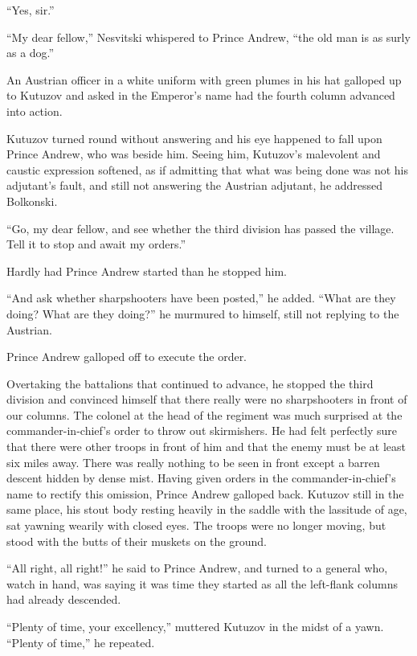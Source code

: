 ``Yes, sir.''

``My dear fellow,'' Nesvitski whispered to Prince Andrew, ``the
old man is as surly as a dog.''

An Austrian officer in a white uniform with green plumes in his
hat galloped up to Kutuzov and asked in the Emperor's name had
the fourth column advanced into action.

Kutuzov turned round without answering and his eye happened to
fall upon Prince Andrew, who was beside him. Seeing him,
Kutuzov's malevolent and caustic expression softened, as if
admitting that what was being done was not his adjutant's fault,
and still not answering the Austrian adjutant, he addressed
Bolkonski.

``Go, my dear fellow, and see whether the third division has
passed the village. Tell it to stop and await my orders.''

Hardly had Prince Andrew started than he stopped him.

``And ask whether sharpshooters have been posted,'' he
added. ``What are they doing? What are they doing?'' he murmured
to himself, still not replying to the Austrian.

Prince Andrew galloped off to execute the order.

Overtaking the battalions that continued to advance, he stopped
the third division and convinced himself that there really were
no sharpshooters in front of our columns. The colonel at the head
of the regiment was much surprised at the commander-in-chief's
order to throw out skirmishers. He had felt perfectly sure that
there were other troops in front of him and that the enemy must
be at least six miles away.  There was really nothing to be seen
in front except a barren descent hidden by dense mist. Having
given orders in the commander-in-chief's name to rectify this
omission, Prince Andrew galloped back. Kutuzov still in the same
place, his stout body resting heavily in the saddle with the
lassitude of age, sat yawning wearily with closed eyes. The
troops were no longer moving, but stood with the butts of their
muskets on the ground.

``All right, all right!'' he said to Prince Andrew, and turned to
a general who, watch in hand, was saying it was time they started
as all the left-flank columns had already descended.

``Plenty of time, your excellency,'' muttered Kutuzov in the
midst of a yawn. ``Plenty of time,'' he repeated.

